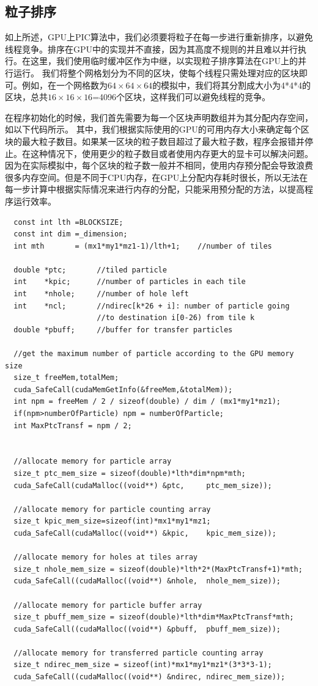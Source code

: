 \subsection{粒子排序}
\label{section:PIC_GPU_reorder}
如上所述，GPU上PIC算法中，我们必须要将粒子在每一步进行重新排序，以避免线程竞争。排序在GPU中的实现并不直接，因为其高度不规则的并且难以并行执行。在这里，我们使用临时缓冲区作为中继，以实现粒子排序算法在GPU上的并行运行。
我们将整个网格划分为不同的区块，使每个线程只需处理对应的区块即可。例如，在一个网格数为$64 \times 64 \times 64$的模拟中，我们将其分割成大小为4*4*4的区块，总共$16 \times 16 \times 16$=4096个区块，这样我们可以避免线程的竞争。

在程序初始化的时候，我们首先需要为每一个区块声明数组并为其分配内存空间，如以下代码所示。
其中，我们根据实际使用的GPU的可用内存大小来确定每个区块的最大粒子数目。如果某一区块的粒子数目超过了最大粒子数，程序会报错并停止。在这种情况下，使用更少的粒子数目或者使用内存更大的显卡可以解决问题。
因为在实际模拟中，每个区块的粒子数一般并不相同，使用内存预分配会导致浪费很多内存空间。但是不同于CPU内存，在GPU上分配内存耗时很长，所以无法在每一步计算中根据实际情况来进行内存的分配，只能采用预分配的方法，以提高程序运行效率。
\begin{lstlisting}
  const int lth =BLOCKSIZE;
  const int dim =_dimension;
  int mth       = (mx1*my1*mz1-1)/lth+1;    //number of tiles

  double *ptc;       //tiled particle
  int    *kpic;      //number of particles in each tile
  int    *nhole;     //number of hole left
  int    *ncl;       //ndirec[k*26 + i]: number of particle going
                     //to destination i[0-26) from tile k
  double *pbuff;     //buffer for transfer particles

  //get the maximum number of particle according to the GPU memory size
  size_t freeMem,totalMem;
  cuda_SafeCall(cudaMemGetInfo(&freeMem,&totalMem));
  int npm = freeMem / 2 / sizeof(double) / dim / (mx1*my1*mz1);
  if(npm>numberOfParticle) npm = numberOfParticle;
  int MaxPtcTransf = npm / 2;


  //allocate memory for particle array
  size_t ptc_mem_size = sizeof(double)*lth*dim*npm*mth;
  cuda_SafeCall(cudaMalloc((void**) &ptc,     ptc_mem_size));

  //allocate memory for particle counting array
  size_t kpic_mem_size=sizeof(int)*mx1*my1*mz1;
  cuda_SafeCall(cudaMalloc((void**) &kpic,    kpic_mem_size));

  //allocate memory for holes at tiles array
  size_t nhole_mem_size = sizeof(double)*lth*2*(MaxPtcTransf+1)*mth;
  cuda_SafeCall((cudaMalloc((void**) &nhole,  nhole_mem_size));

  //allocate memory for particle buffer array
  size_t pbuff_mem_size = sizeof(double)*lth*dim*MaxPtcTransf*mth;
  cuda_SafeCall((cudaMalloc((void**) &pbuff,  pbuff_mem_size));

  //allocate memory for transferred particle counting array
  size_t ndirec_mem_size = sizeof(int)*mx1*my1*mz1*(3*3*3-1);
  cuda_SafeCall((cudaMalloc((void**) &ndirec, ndirec_mem_size));
\end{lstlisting}

